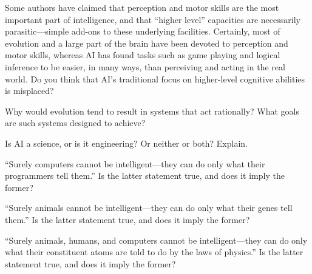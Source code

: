 \begin{iexercise}
Some authors have claimed that perception and motor
skills are the most important part of intelligence, and that
``higher level'' capacities are necessarily parasitic---simple add-ons
to these underlying facilities.  Certainly, most of
evolution and a large part of the brain have been
devoted to perception and motor skills, whereas AI has found tasks
such as game playing and logical inference to be easier, in many ways,
than perceiving and acting in the real world. Do you think that AI's
traditional focus on higher-level cognitive abilities is misplaced?
\end{iexercise} 

\begin{uexercise}
    Why would evolution tend to result in systems that act rationally?
    What goals are such systems designed to achieve?
\end{uexercise} 

\begin{exercise}
Is AI a science, or is it engineering? Or neither or both? Explain.
\end{exercise} 

\begin{exercise}
``Surely computers cannot be intelligent---they can do only what their
programmers tell them.'' Is the latter statement true, and does it imply the
former?
\end{exercise} 

\begin{exercise}
``Surely animals cannot be intelligent---they can do only what their
genes tell them.''  Is the latter statement true, and does it imply the
former?
\end{exercise} 

\begin{exercise}
``Surely animals, humans, and computers cannot be intelligent---they 
can do only what their constituent atoms are told to do by the laws 
of physics.''  Is the latter statement 
true, and does it imply the former?
\end{exercise} 



